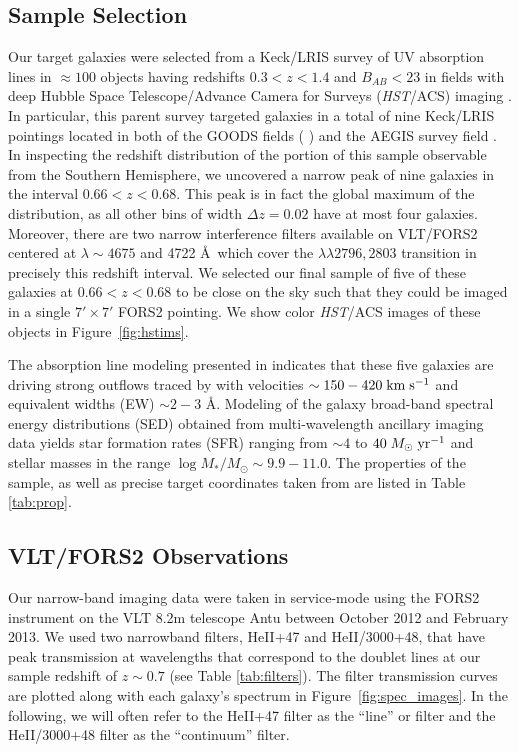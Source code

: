 \documentclass[twocolumn]{aastex61}
\def \mkms {{\rm \; km\;s^{-1}}}
\def \msunperyr {{\; M_{\odot}\rm \;yr^{-1}}}
\begin{document}
\subsection{Sample Selection}
Our target galaxies were selected from a Keck/LRIS survey of UV absorption lines in $\approx 100$ objects having redshifts $0.3< z < 1.4$ and $B_{AB}< 23$ in fields with deep Hubble Space Telescope/Advance Camera for Surveys (\emph{HST}/ACS) imaging \citep{Rubin_2014}.  In particular, this parent survey targeted galaxies in a total of nine Keck/LRIS pointings located in both of the GOODS fields (\citeauthor{Giavalisco2004} \citeyear{Giavalisco2004}) and the AEGIS survey field \citep[the Extended Groth Strip;][]{Davis2007}.  In inspecting the redshift distribution of the portion of this sample observable from the Southern Hemisphere, we uncovered a narrow peak of nine galaxies in the interval $0.66 < z < 0.68$.  This peak is in fact the global maximum of the distribution, as all other bins of width $\Delta z = 0.02$ have at most four galaxies.  Moreover, there are two narrow interference filters available on VLT/FORS2 centered at $\lambda \sim 4675$ and 4722 \AA\ which cover the  $\lambda \lambda 2796, 2803$ transition in precisely this redshift interval.  We selected our final sample of five of these galaxies at $0.66 < z < 0.68$ to be close on the sky such that they could be imaged in a single $7' \times 7' $ FORS2 pointing.  
We show color {\it HST}/ACS images of these objects in Figure~\ref{fig:hstims}.

The absorption line modeling presented in \cite{Rubin_2014} indicates that these five galaxies are driving strong outflows traced by   with velocities $\sim150-420\mkms$ and equivalent widths (EW) $\sim 2-3$ \AA.  Modeling of the galaxy broad-band spectral energy distributions (SED) obtained from multi-wavelength ancillary imaging data yields star formation rates (SFR) ranging from $\sim4$ to $40\msunperyr$ and stellar masses in the range $\log M_*/M_{\odot}\sim 9.9-11.0$. The properties of the sample, as well as precise target coordinates taken from \cite{Rubin_2014} are listed in Table \ref{tab:prop}. 


\subsection{VLT/FORS2 Observations}
Our narrow-band imaging data were taken in service-mode using the FORS2 instrument on the VLT 8.2m telescope Antu between October 2012 and February 2013. 
We used two narrowband filters, HeII+47 and HeII/3000+48, that have peak transmission at wavelengths that correspond to the  doublet lines at our sample redshift of $z\sim0.7$ (see Table \ref{tab:filters}). The filter transmission curves are plotted along with each galaxy's spectrum in Figure~\ref{fig:spec_images}.
In the following, we will often refer to the HeII+47 filter as the ``line'' or  filter and the HeII/3000+48 filter as the ``continuum'' filter.
\end{document}
